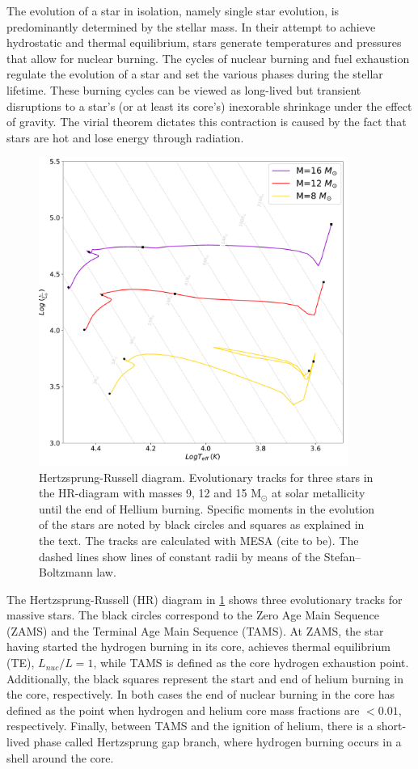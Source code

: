 The evolution of a star in isolation, namely single star evolution, is predominantly determined by the stellar mass. In their attempt to achieve hydrostatic and thermal equilibrium, stars generate temperatures and pressures that allow for nuclear burning. The cycles of nuclear burning and fuel exhaustion regulate the evolution of a star and set the various phases during the stellar lifetime. These burning cycles can be viewed as long-lived but transient disruptions to a star's (or at least its core's) inexorable shrinkage under the effect of gravity. The virial theorem dictates this contraction is caused by the fact that stars are hot and lose energy through radiation. 
\begin{figure}[H]
    \centering
    \includegraphics[width=0.9\textwidth]{Thesis/graphs/HR_massive_stars.pdf}
    \caption{Hertzsprung-Russell diagram. Evolutionary tracks for three stars in the HR-diagram with masses 9, 12 and 15 M$_{\odot}$ at solar metallicity until the end of Hellium burning. Specific moments in the evolution of the stars are noted by black circles and squares as explained in the text. The tracks are calculated with MESA (cite to be). The dashed lines show lines of constant radii by means of the Stefan–Boltzmann law.}
    \label{fig:HR_massive_stars}
\end{figure}
The Hertzsprung-Russell (HR) diagram in \cref{fig:HR_massive_stars} shows three evolutionary tracks for massive stars. The black circles correspond to the Zero Age Main Sequence (ZAMS) and the Terminal Age Main Sequence (TAMS). At ZAMS, the star having started the hydrogen burning in its core, achieves thermal equilibrium (TE), $L_{nuc}/L =1$, while TAMS is defined as the core hydrogen exhaustion point. Additionally, the black squares represent the start and end of helium burning in the core, respectively. In both cases the end of nuclear burning in the core has defined as the point when hydrogen and helium core mass fractions are $< 0.01$, respectively. Finally, between TAMS and the ignition of helium, there is a short-lived phase called Hertzsprung gap branch, where hydrogen burning occurs in a shell around the core. 

